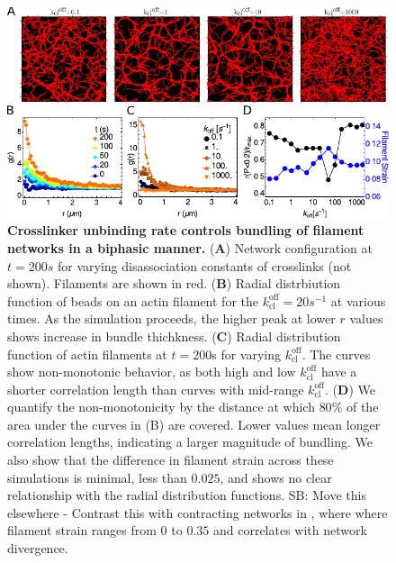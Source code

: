 \documentclass[11pt]{article}
\begin{document}
\par
\begin{figure}[h]
  \centering
  \includegraphics[width=\columnwidth]{figs/bundling/full_figure.pdf}
  \caption{%
  \label{fig:bundle}%
 {\bf Crosslinker unbinding rate controls bundling of filament networks in a biphasic manner.} (\textbf{A}) {\color{red}Network configuration at} $t=200s$ for varying disassociation constants of {\color{red}crosslinks (not shown)}. Filaments {\color{red}are shown} in red. 
  (\textbf{B}) Radial distrbiution function of beads on an actin filament for the $k_\text{cl}^\text{off}=20 s^{-1}$ at
  various times. As the simulation proceeds, the higher peak at lower $r$ values shows {\color{red}increase in} bundle {\color{red}thichkness}.
  (\textbf{C}) Radial distribution function of actin filaments at $t=200$s for varying $k_\text{cl}^\text{off}$. 
  The curves show non-monotonic
  behavior, as both high and low $k_\text{cl}^\text{off}$ have a shorter correlation {\color{red}length} than curves with mid-range
  $k_\text{cl}^\text{off}$.  
  (\textbf{D}) We {\color{red}quantify the} non-monotonicity by the distance at which $80\%$ of the area under the curves in 
  (B) are covered. Lower values mean longer correlation lengths, indicating a larger magnitude
of bundling. We also show that the difference in filament strain across these simulations is minimal, less than $0.025$, and shows no clear relationship with the radial distribution functions. 
{\color{blue}SB: Move this elsewhere - Contrast this with contracting networks in , where where filament strain ranges from $0$ to $0.35$ and correlates with network divergence}.  
}
\end{figure}
\end{document}
